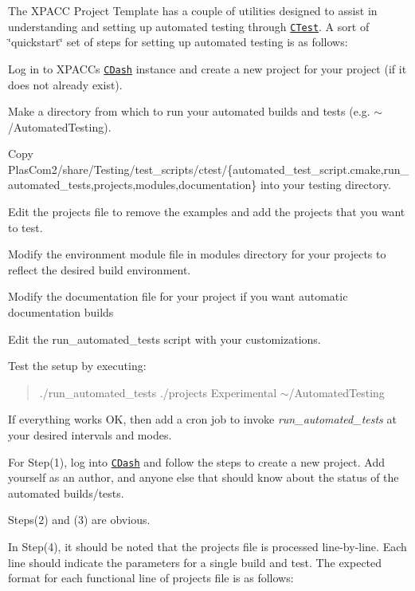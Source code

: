The X\+P\+A\+CC Project Template has a couple of utilities designed to assist in understanding and setting up automated testing through \href{http://www.cmake.org/cmake/help/v2.8.8/ctest.html}{\tt C\+Test}. A sort of \char`\"{}quickstart\char`\"{} set of steps for setting up automated testing is as follows\+:
\begin{DoxyEnumerate}
\item Log in to X\+P\+A\+CC\textquotesingle{}s \href{http://xpacc-cluster-hn.csl.illinois.edu/CDash}{\tt C\+Dash} instance and create a new project for your project (if it does not already exist).
\item Make a directory from which to run your automated builds and tests (e.\+g. $\sim$/\+Automated\+Testing).
\item Copy {\ttfamily Plas\+Com2/share/\+Testing/test\+\_\+scripts/ctest/\{automated\+\_\+test\+\_\+script.\+cmake},run\+\_\+automated\+\_\+tests,projects,modules,documentation\} into your testing directory.
\item Edit the projects file to remove the examples and add the projects that you want to test.
\item Modify the environment module file in modules directory for your projects to reflect the desired build environment.
\item Modify the documentation file for your project if you want automatic documentation builds
\item Edit the run\+\_\+automated\+\_\+tests script with your customizations.
\item Test the setup by executing\+: \begin{quote}
{\ttfamily }./run\+\_\+automated\+\_\+tests {\ttfamily }./projects Experimental {\ttfamily $\sim$/\+Automated\+Testing} \end{quote}

\item If everything works OK, then add a cron job to invoke {\itshape run\+\_\+automated\+\_\+tests} at your desired intervals and modes.
\end{DoxyEnumerate}

For Step(1), log into \href{http://xpacc-cluster-hn.csl.illinois.edu/CDash}{\tt C\+Dash} and follow the steps to create a new project. Add yourself as an author, and anyone else that should know about the status of the automated builds/tests.

Steps(2) and (3) are obvious.

In Step(4), it should be noted that the projects file is processed line-\/by-\/line. Each line should indicate the parameters for a single build and test. The expected format for each functional line of projects file is as follows\+:

